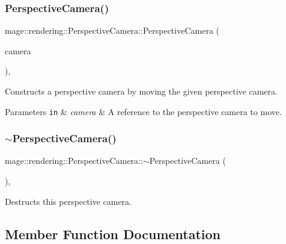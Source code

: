 \subsubsection{\texorpdfstring{Perspective\+Camera()}{PerspectiveCamera()}\hspace{0.1cm}{\footnotesize\ttfamily [3/3]}}
{\footnotesize\ttfamily mage\+::rendering\+::\+Perspective\+Camera\+::\+Perspective\+Camera (\begin{DoxyParamCaption}\item[{\hyperlink{classmage_1_1rendering_1_1_perspective_camera}{Perspective\+Camera} \&\&}]{camera }\end{DoxyParamCaption})\hspace{0.3cm}{\ttfamily [default]}, {\ttfamily [noexcept]}}

Constructs a perspective camera by moving the given perspective camera.


\begin{DoxyParams}[1]{Parameters}
\mbox{\tt in}  & {\em camera} & A reference to the perspective camera to move. \\
\hline
\end{DoxyParams}
\hypertarget{classmage_1_1rendering_1_1_perspective_camera_ac9bc0faebd323ca26d0311e35612d219}{}\label{classmage_1_1rendering_1_1_perspective_camera_ac9bc0faebd323ca26d0311e35612d219} 
\subsubsection{\texorpdfstring{$\sim$\+Perspective\+Camera()}{~PerspectiveCamera()}}
{\footnotesize\ttfamily mage\+::rendering\+::\+Perspective\+Camera\+::$\sim$\+Perspective\+Camera (\begin{DoxyParamCaption}{ }\end{DoxyParamCaption})\hspace{0.3cm}{\ttfamily [virtual]}, {\ttfamily [default]}}

Destructs this perspective camera. 

\subsection{Member Function Documentation}
\hypertarget{classmage_1_1rendering_1_1_perspective_camera_a835369a1652074eed3a7d09e01a40430}{}\label{classmage_1_1rendering_1_1_perspective_camera_a835369a1652074eed3a7d09e01a40430} 
